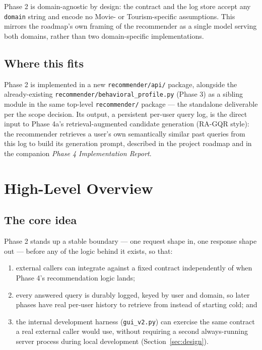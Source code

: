 \documentclass[11pt,a4paper]{article}
\newcommand{\code}[1]{\texttt{#1}}
\begin{document}
Phase 2 is domain-agnostic by design: the contract and the log store accept any \code{domain}
string and encode no Movie- or Tourism-specific assumptions. This mirrors the roadmap's own
framing of the recommender as a single model serving both domains, rather than two
domain-specific implementations.

\subsection{Where this fits}
\label{sec:where}

Phase 2 is implemented in a new \code{recommender/api/} package, alongside the already-existing
\code{recommender/behavioral\_profile.py} (Phase 3) as a sibling module in the same top-level
\code{recommender/} package --- the standalone deliverable per the scope decision. Its output, a
persistent per-user query log, is the direct input to Phase 4a's retrieval-augmented candidate
generation (RA-GQR style): the recommender retrieves a user's own semantically similar past
queries from this log to build its generation prompt, described in the project roadmap and in the
companion \emph{Phase 4 Implementation Report}.

\newpage
\section{High-Level Overview}

\subsection{The core idea}

Phase 2 stands up a stable boundary --- one request shape in, one response shape out --- before
any of the logic behind it exists, so that:

\begin{enumerate}[label=(\alph*)]
    \item external callers can integrate against a fixed contract independently of when Phase 4's
        recommendation logic lands;
    \item every answered query is durably logged, keyed by user and domain, so later phases have
        real per-user history to retrieve from instead of starting cold; and
    \item the internal development harness (\code{gui\_v2.py}) can exercise the same contract a
        real external caller would use, without requiring a second always-running server process
        during local development (Section~\ref{sec:design}).
\end{enumerate}
\end{document}

